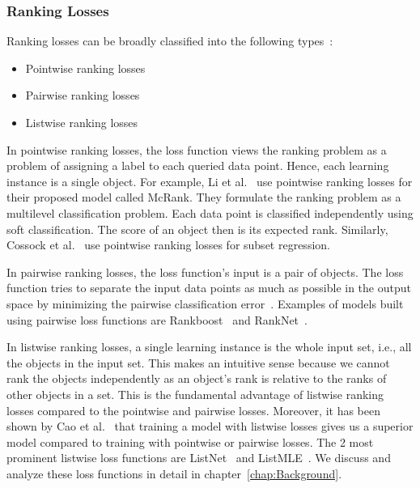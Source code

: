 \documentclass[12pt, twoside, ngerman]{report}
\begin{document}
\subsubsection{Ranking Losses}
\label{sec:ranklearning}

Ranking losses can be broadly classified into the following types~\cite{RankingLossFirstPaperRead}:
\begin{itemize}
\item  Pointwise ranking losses
\item  Pairwise ranking losses
\item  Listwise ranking losses
\end{itemize}

In pointwise ranking losses,  the loss function views the ranking problem as a problem of assigning a label to each queried data point.
Hence,  each learning instance is a single object.
For example, Li et al.~\cite{McRank} use pointwise ranking losses for their proposed model called McRank.
They formulate the ranking problem as a multilevel classification problem.
Each data point is classified independently using soft classification.
The score of an object then is its expected rank.
Similarly, Cossock et al.~\cite{subsetregressionpaper} use pointwise ranking losses for subset regression. 

In pairwise ranking losses,  the loss function's input is a pair of objects.
The loss function tries to separate the input data points as much as possible in the output space by minimizing the pairwise classification error~\cite{pairwisepreferencespaper}.
Examples of models built using pairwise loss functions are Rankboost~\cite{rankboostpaper} and RankNet~\cite{ranknetpaper}.

In listwise ranking losses,  a single learning instance is the whole input set, i.e., all the objects in the input set.
This makes an intuitive sense because we cannot rank the objects independently as an object's rank is relative to the ranks of other objects in a set.
This is the fundamental advantage of listwise ranking losses compared to the pointwise and pairwise losses.
Moreover,  it has been shown by Cao et al.~\cite{listwisebetter} that training a model with listwise losses gives us a superior model compared to training with pointwise or pairwise losses.
The 2 most prominent listwise loss functions are ListNet~\cite{listwisebetter} and ListMLE~\cite{listmlepaper}.
We discuss and analyze these loss functions in detail in chapter~\ref{chap:Background}.
\end{document}
